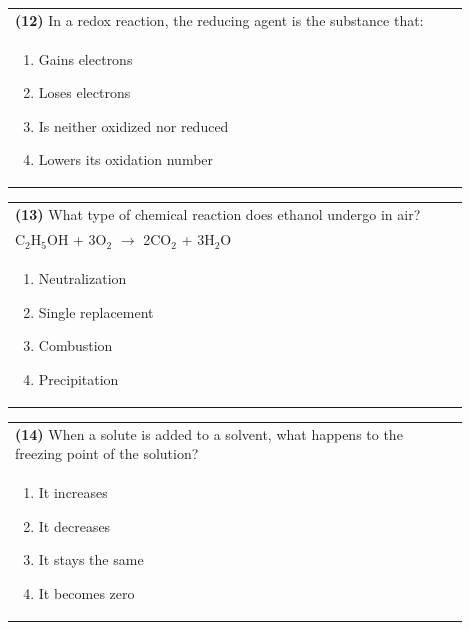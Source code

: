 \documentclass{article}
\begin{document}
\noindent\begin{tabular}{|p{0.9\linewidth}|}
\hline
\textbf{(12)} In a redox reaction, the reducing agent is the substance that:\\[0.2cm]
\begin{minipage}[t]{0.85\linewidth}
\begin{enumerate}[label=\alph*.]
\item Gains electrons
\item Loses electrons
\item Is neither oxidized nor reduced
\item Lowers its oxidation number
\end{enumerate}
\end{minipage}\\[0.2cm]
\hline
\end{tabular}
\newpage


\noindent\begin{tabular}{|p{0.9\linewidth}|}
\hline
\textbf{(13)} What type of chemical reaction does ethanol undergo in air?\\[0.2cm]
C$_2$H$_5$OH + 3O$_2$ $\rightarrow$ 2CO$_2$ + 3H$_2$O\\[0.2cm]
\begin{minipage}[t]{0.85\linewidth}
\begin{enumerate}[label=\alph*.]
\item Neutralization
\item Single replacement
\item Combustion
\item Precipitation
\end{enumerate}
\end{minipage}\\[0.2cm]
\hline
\end{tabular}

\noindent\begin{tabular}{|p{0.9\linewidth}|}
\hline
\textbf{(14)} When a solute is added to a solvent, what happens to the freezing point of the solution?\\[0.2cm]
\begin{minipage}[t]{0.85\linewidth}
\begin{enumerate}[label=\alph*.]
\item It increases
\item It decreases
\item It stays the same
\item It becomes zero
\end{enumerate}
\end{minipage}\\[0.2cm]
\hline
\end{tabular}
\end{document}

